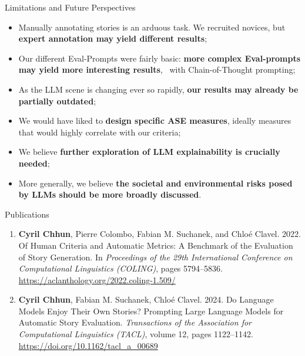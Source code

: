 \begin{frame}{Limitations and Future Perspectives}
    \begin{itemize}
        \item Manually annotating stories is an arduous task. We recruited novices, but \textbf{expert annotation may yield different results};
        \item Our different Eval-Prompts were fairly basic: \textbf{more complex Eval-prompts may yield more interesting results}, \eg\ with Chain-of-Thought prompting; 
        \item As the LLM scene is changing ever so rapidly, \textbf{our results may already be partially outdated};
        \item We would have liked to \textbf{design specific ASE measures}, ideally measures that would highly correlate with our criteria;
        \item We believe \textbf{further exploration of LLM explainability is crucially needed};
        \item More generally, we believe \textbf{the societal and environmental risks posed by LLMs should be more broadly discussed}.
    \end{itemize}
\end{frame}

\begin{frame}{Publications}
    \begin{enumerate}
        \item \textbf{Cyril Chhun}, Pierre Colombo, Fabian M. Suchanek, and Chloé Clavel. 2022. Of Human Criteria and Automatic Metrics: A Benchmark of the Evaluation of Story Generation. In \textit{Proceedings of the 29th International Conference on Computational Linguistics (COLING)}, pages 5794--5836.\\\url{https://aclanthology.org/2022.coling-1.509/}
        \item \textbf{Cyril Chhun}, Fabian M. Suchanek, Chloé Clavel. 2024. Do Language Models Enjoy Their Own Stories? Prompting Large Language Models for Automatic Story Evaluation. \textit{Transactions of the Association for Computational Linguistics (TACL)}, volume 12, pages 1122--1142.\\\url{https://doi.org/10.1162/tacl_a_00689}
    \end{enumerate}
\end{frame}

